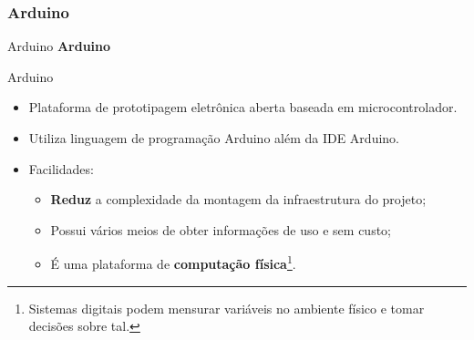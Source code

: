 
	\subsubsection{Arduino}
	\begin{frame}{Arduino}
		\centering \color{blue} {\Huge \textbf{Arduino} \\[0.5cm]}%
	\end{frame}
	\begin{frame}{Arduino}
		\begin{itemize}
  			\setlength\itemsep{0.8em}
			\item Plataforma de prototipagem eletrônica aberta baseada em microcontrolador.
			\item Utiliza linguagem de programação Arduino além da IDE Arduino.
			\item Facilidades:
			\begin{itemize}	
  				\setlength\itemsep{0.3em}
				\item \textbf{Reduz} a complexidade da montagem da infraestrutura do projeto;
				\item Possui vários meios de obter informações de uso e sem custo;
				\item É uma plataforma de \textbf{computação física}\footnote{Sistemas digitais podem mensurar variáveis no ambiente físico e tomar decisões sobre tal.}.
			\end{itemize}
		\end{itemize}
	\end{frame}
